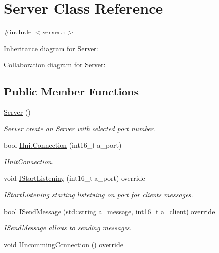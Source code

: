 \hypertarget{classServer}{}\section{Server Class Reference}
\label{classServer}


{\ttfamily \#include $<$server.\+h$>$}



Inheritance diagram for Server\+:


Collaboration diagram for Server\+:
\subsection*{Public Member Functions}
\begin{DoxyCompactItemize}
\item 
\hyperlink{classServer_ad5ec9462b520e59f7ea831e157ee5e59}{Server} ()
\begin{DoxyCompactList}\small\item\em \hyperlink{classServer}{Server} create an \hyperlink{classServer}{Server} with selected port number. \end{DoxyCompactList}\item 
bool \hyperlink{classServer_aaec9faaa11db546a4ccc75a05c2678b6}{I\+Init\+Connection} (int16\+\_\+t a\+\_\+port)
\begin{DoxyCompactList}\small\item\em I\+Init\+Connection. \end{DoxyCompactList}\item 
void \hyperlink{classServer_a6cf5e9e8ae0d4c818f989d7ec4739c99}{I\+Start\+Listening} (int16\+\_\+t a\+\_\+port) override
\begin{DoxyCompactList}\small\item\em I\+Start\+Listening starting listetning on port for clients messages. \end{DoxyCompactList}\item 
bool \hyperlink{classServer_a7f43c5c286c0a64624a803fcf2f3c85a}{I\+Send\+Message} (std\+::string a\+\_\+message, int16\+\_\+t a\+\_\+client) override
\begin{DoxyCompactList}\small\item\em I\+Send\+Message allows to sending messages. \end{DoxyCompactList}\item 
void \hyperlink{classServer_a404070676bda1e2582cd6b467e73b6a2}{I\+Incomming\+Connection} () override\hypertarget{classServer_a404070676bda1e2582cd6b467e73b6a2}{}\label{classServer_a404070676bda1e2582cd6b467e73b6a2}


\end{DoxyCompactItemize}

